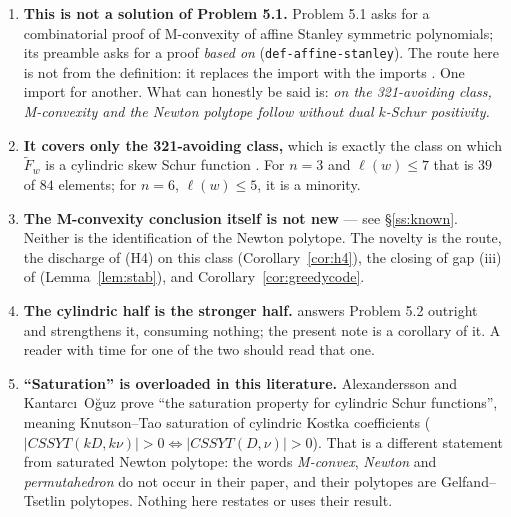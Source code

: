 \documentclass[11pt]{article}
\theoremstyle{plain}
\theoremstyle{definition}
\newcommand{\Fw}{\widetilde{F}_{w}}
\begin{document}
\begin{enumerate}
\item \textbf{This is not a solution of Problem 5.1.} Problem 5.1 asks for a combinatorial
proof of M-convexity of affine Stanley symmetric polynomials; its preamble asks for a proof
\emph{based on} (\texttt{def-affine-stanley}). The route here is not from the definition: it
replaces the import \cite[Cor.~8.5]{Lam2008} with the imports
\cite[\texttt{thm:321}, \texttt{thm:monomial}]{Lam2006}. One import for another. What can
honestly be said is: \emph{on the 321-avoiding class, M-convexity and the Newton polytope
follow without dual $k$-Schur positivity.}
\item \textbf{It covers only the 321-avoiding class,} which is exactly the class on which
$\Fw$ is a cylindric skew Schur function \cite[\texttt{sec:321}]{Lam2006}. For $n=3$ and
$\ell(w)\le7$ that is $39$ of $84$ elements; for $n=6$, $\ell(w)\le5$, it is a minority.
\item \textbf{The M-convexity conclusion itself is not new} --- see \S\ref{ss:known}. Neither
is the identification of the Newton polytope. The novelty is the route, the discharge of (H4)
on this class (Corollary~\ref{cor:h4}), the closing of gap (iii) of \cite{Clio2026}
(Lemma~\ref{lem:stab}), and Corollary~\ref{cor:greedycode}.
\item \textbf{The cylindric half is the stronger half.} \cite{Clio2026} answers Problem 5.2
outright and strengthens it, consuming nothing; the present note is a corollary of it. A
reader with time for one of the two should read that one.
\item \textbf{``Saturation'' is overloaded in this literature.} Alexandersson and Kantarc\i\
O\u{g}uz \cite{AKO} prove ``the saturation property for cylindric Schur functions'', meaning
Knutson--Tao saturation of cylindric Kostka coefficients
($|CSSYT(k D,k\nu)|>0\iff|CSSYT(D,\nu)|>0$). That is a different statement from saturated
Newton polytope: the words \emph{M-convex}, \emph{Newton} and \emph{permutahedron} do not
occur in their paper, and their polytopes are Gelfand--Tsetlin polytopes. Nothing here
restates or uses their result.
\end{enumerate}
\end{document}
